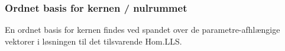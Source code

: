 %
%
%
%
%

\subsubsection{Ordnet basis for kernen / nulrummet}
En ordnet basis for kernen findes ved spandet over de parametre-afhlængige vektorer i løsningen til det tilsvarende Hom.LLS.

